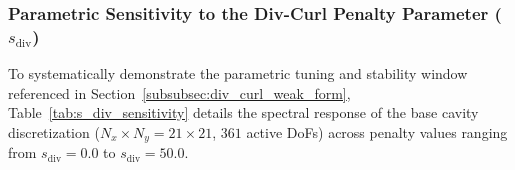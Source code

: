 \documentclass[preprint,12pt]{elsarticle}
\begin{document}
\subsubsection{Parametric Sensitivity to the Div-Curl Penalty Parameter (\texorpdfstring{$s_{\mathrm{div}}$}{s(div)})}
\label{subsubsec:s_div_sensitivity}

To systematically demonstrate the parametric tuning and stability window referenced in Section~\ref{subsubsec:div_curl_weak_form}, Table~\ref{tab:s_div_sensitivity} details the spectral response of the base cavity discretization ($N_x \times N_y = 21 \times 21$, $361$ active DoFs) across penalty values ranging from $s_{\mathrm{div}} = 0.0$ to $s_{\mathrm{div}} = 50.0$.

\begin{table}[!htbp]
    \centering
    \caption{Parametric sensitivity of cavity spectral purity, cutoff wavenumber error, and stiffness matrix conditioning to the div-curl penalty parameter $s_{\mathrm{div}}$ ($361$ active DoFs, $10 \times 10$ cells, $2 \times 2$ Gauss points).}
    \label{tab:s_div_sensitivity}
\end{table}
\end{document}
